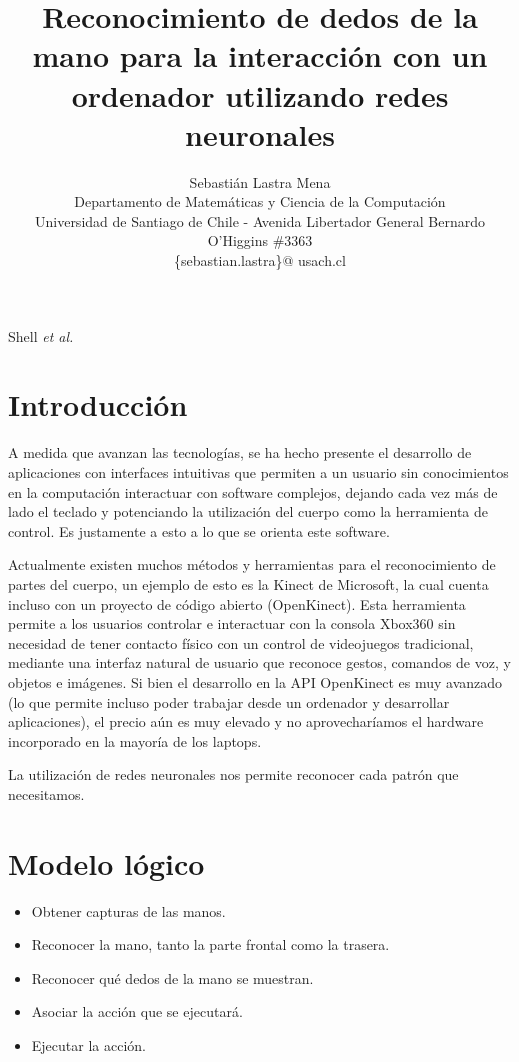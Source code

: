 \documentclass[journal]{IEEEtran}
\begin{document}
\title{Reconocimiento de dedos de la mano para la interacción con un ordenador utilizando redes neuronales}

\author{Sebastián Lastra Mena \\ Departamento de Matemáticas y Ciencia de la Computación \\ Universidad de Santiago de Chile - Avenida Libertador General Bernardo O'Higgins \#3363 \\ \{sebastian.lastra\}@ usach.cl 
}

{Shell \MakeLowercase{\textit{et al.}}}

\maketitle


\IEEEpeerreviewmaketitle



\section{Introducción}

	A medida que avanzan las tecnologías, se ha hecho presente el desarrollo de aplicaciones con interfaces intuitivas que permiten a un usuario sin conocimientos en la computación interactuar con software complejos, dejando cada vez más de lado el teclado y potenciando la utilización del cuerpo como la herramienta de control. Es justamente a esto a lo que se orienta este software.

	Actualmente existen muchos métodos y herramientas para el reconocimiento de partes del cuerpo, un ejemplo de esto es la Kinect de Microsoft, la cual cuenta incluso con un proyecto de código abierto (OpenKinect). Esta herramienta permite a los usuarios controlar e interactuar con la consola Xbox360 sin necesidad de tener contacto físico con un control de videojuegos tradicional, mediante una interfaz natural de usuario que reconoce gestos, comandos de voz, y objetos e imágenes. Si bien el desarrollo en la API OpenKinect es muy avanzado (lo que permite incluso poder trabajar desde un ordenador y desarrollar aplicaciones), el precio aún es muy elevado y no aprovecharíamos el hardware incorporado en la mayoría de los laptops.
	
	La utilización de redes neuronales nos permite reconocer cada patrón que necesitamos.

\section{Modelo lógico}
\begin{itemize}
	\item Obtener capturas de las manos.
	\item Reconocer la mano, tanto la parte frontal como la trasera.
	\item Reconocer qué dedos de la mano se muestran.
	\item Asociar la acción que se ejecutará.
	\item Ejecutar la acción.
\end{itemize}
\end{document}
